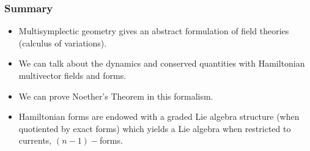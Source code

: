 \begin{frame}
    \frametitle{Summary}
    \begin{itemize}
        \item Multisymplectic geometry gives an abstract formulation of field theories (calculus of variations).
        \item We can talk about the dynamics and conserved quantities with Hamiltonian multivector fields and forms.
        \item We can prove Noether's Theorem in this formalism.
        \item Hamiltonian forms are endowed with a graded Lie algebra structure (when
        quotiented by exact forms) which yields a Lie algebra when restricted to currents,
        $(n-1)-$forms.
    \end{itemize}
\end{frame}